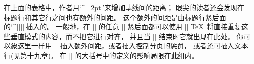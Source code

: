 \danger 在上面的表格中，作者用`^|\openup||2pt|'来增加基线间的距离；
眼尖的读者还会发现在标题行和其它行之间也有额外的间距。%
这个额外的间距是由标题行紧后面的`^|\noalign||{\smallskip}|'插入的。%
一般地，在 |\halign| 的任意 |\cr| 紧后面都可以使用
\begindisplay
||
\enddisplay
 \TeX\ 将直接重复这些垂直模式的内容，而不把它进行对齐，
并且当 |\halign| 结束时它就出现在此处。%
你可以象这里一样用 |\noalign| 插入额外间距，或者插入控制分页的惩罚，
或者还可插入文本行(见第十九章)。%
在 |\noalign| 的大括号中的定义的影响局限在此组内。

